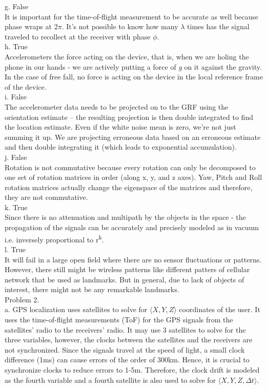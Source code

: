 \documentclass[a4paper]{article}
\begin{document}
g. False\\
It is important for the time-of-flight measurement to be accurate as well because phase wraps at 2$\pi$. It's not possible to know how many $\lambda$ times has the signal traveled to recollect at the receiver with phase $\phi$.\\

h. True\\
Accelerometers the force acting on the device, that is, when we are holing the phone in our hands - we are actively putting a force of \textit{g} on it against the gravity. In the case of free fall, no force is acting on the device in the local reference frame of the device.\\

i. False\\
The accelerometer data needs to be projected on to the GRF using the orientation estimate -- the resulting projection is then double integrated to find the location estimate. Even if the white noise mean is zero, we're not just summing it up. We are projecting erroneous data based on an erroneous estimate and then double integrating it (which leads to exponential accumulation).\\

j. False\\
Rotation is not commutative because every rotation can only be decomposed to one set of rotation matrices in order (along x, y, and z axes). Yaw, Pitch and Roll rotation matrices actually change the eigenspace of the matrices and therefore, they are not commutative.\\

k. True\\
Since there is no attenuation and multipath by the objects in the space - the propagation of the signals can be accurately and precisely modeled as in vacuum i.e. inversely proportional to r\textsuperscript{k}.\\

l. True\\
It will fail in a large open field where there are no sensor fluctuations or patterns. However, there still might be wireless patterns like different patters of cellular network that be used as landmarks. But in general, due to lack of objects of interest, there might not be any remarkable landmarks. \\

Problem 2. \\

a. GPS localization uses satellites to solve for $\langle X, Y, Z \rangle$ coordinates of the user. It uses the time-of-flight measurements (ToF) for the GPS signals from the satellites' radio to the receivers' radio. It may use 3 satellites to solve for the three variables, however, the clocks between the satellites and the receivers are not synchronized. Since the signals travel at the speed of light, a small clock difference (1ms) can cause errors of the order of 300km. Hence, it is crucial to synchronize clocks to reduce errors to 1-5m. Therefore, the clock drift is modeled as the fourth variable and a fourth satellite is also used to solve for $\langle X, Y, Z, \Delta t\rangle$.\\
\end{document}
